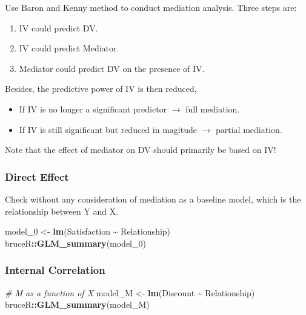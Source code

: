 \documentclass[
]{ctexart}
\newenvironment{Shaded}{\begin{snugshade}}{\end{snugshade}}
\newcommand{\CommentTok}[1]{\textcolor[rgb]{0.56,0.35,0.01}{\textit{#1}}}
\newcommand{\FunctionTok}[1]{\textcolor[rgb]{0.13,0.29,0.53}{\textbf{#1}}}
\newcommand{\NormalTok}[1]{#1}
\newcommand{\OtherTok}[1]{\textcolor[rgb]{0.56,0.35,0.01}{#1}}
\newcommand{\SpecialCharTok}[1]{\textcolor[rgb]{0.81,0.36,0.00}{\textbf{#1}}}
\providecommand{\tightlist}{%
  \setlength{\itemsep}{0pt}\setlength{\parskip}{0pt}}
\begin{document}
Use Baron and Kenny method to conduct mediation analysis. Three steps
are:

\begin{enumerate}
\def\labelenumi{\arabic{enumi}.}
\tightlist
\item
  IV could predict DV.
\item
  IV could predict Mediator.
\item
  Mediator could predict DV on the presence of IV.
\end{enumerate}

Besides, the predictive power of IV is then reduced,

\begin{itemize}
\tightlist
\item
  If IV is no longer a significant predictor \(\to\) full mediation.
\item
  If IV is still significant but reduced in magitude \(\to\) partial
  mediation.
\end{itemize}

Note that the effect of mediator on DV should primarily be based on IV!

\hypertarget{direct-effect}{%
\subsubsection{Direct Effect}\label{direct-effect}}

Check without any consideration of mediation as a baseline model, which
is the relationship between Y and X.

\begin{Shaded}
\begin{Highlighting}[]
\NormalTok{model\_0 }\OtherTok{\textless{}{-}} \FunctionTok{lm}\NormalTok{(Satisfaction }\SpecialCharTok{\textasciitilde{}}\NormalTok{ Relationship)}
\NormalTok{bruceR}\SpecialCharTok{::}\FunctionTok{GLM\_summary}\NormalTok{(model\_0)}
\end{Highlighting}
\end{Shaded}

\hypertarget{internal-correlation}{%
\subsubsection{Internal Correlation}\label{internal-correlation}}

\begin{Shaded}
\begin{Highlighting}[]
\CommentTok{\# M as a function of X}
\NormalTok{model\_M }\OtherTok{\textless{}{-}} \FunctionTok{lm}\NormalTok{(Discount }\SpecialCharTok{\textasciitilde{}}\NormalTok{ Relationship)}
\NormalTok{bruceR}\SpecialCharTok{::}\FunctionTok{GLM\_summary}\NormalTok{(model\_M)}
\end{Highlighting}
\end{Shaded}
\end{document}
